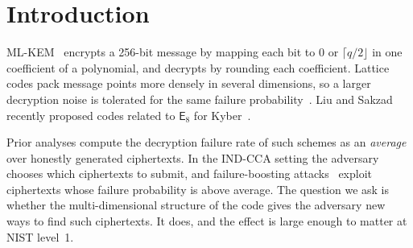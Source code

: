 \documentclass[11pt,a4paper]{article}
\theoremstyle{definition}
\theoremstyle{remark}
\newcommand{\E}{\mathsf{E}_8}
\begin{document}
\noindent{}

\tableofcontents

\section{Introduction}

ML-KEM~\cite{fips203} encrypts a 256-bit message by mapping each bit to $0$ or $\lceil q/2\rfloor$ in one coefficient of a polynomial, and decrypts by rounding each coefficient. Lattice codes pack message points more densely in several dimensions, so a larger decryption noise is tolerated for the same failure probability~\cite{saliba21,liu23,paiva24,liu26}. Liu and Sakzad recently proposed codes related to $\E$ for Kyber~\cite{liu26}.

Prior analyses compute the decryption failure rate of such schemes as an \emph{average} over honestly generated ciphertexts. In the IND-CCA setting the adversary chooses which ciphertexts to submit, and failure-boosting attacks~\cite{danvers19,danvers20} exploit ciphertexts whose failure probability is above average. The question we ask is whether the multi-dimensional structure of the code gives the adversary new ways to find such ciphertexts. It does, and the effect is large enough to matter at NIST level~1.
\end{document}
